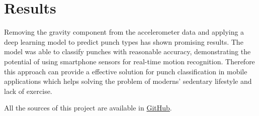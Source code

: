\documentclass{article}
\begin{document}
\FloatBarrier
\section{Results}
Removing the gravity component from the accelerometer data and applying a deep learning model to predict punch types has shown promising results. The model was able to classify punches with reasonable accuracy, demonstrating the potential of using smartphone sensors for real-time motion recognition. Therefore this approach can provide a effective solution for punch classification in mobile applications which helps solving the problem of moderns' sedentary lifestyle and lack of exercise.

All the sources of this project are available in \href{https://github.com/punch-boxing/}{GitHub}.
\end{document}
